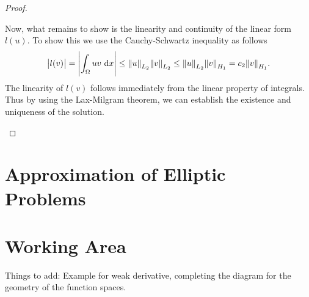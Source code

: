 \begin{proof}
\begin{enumerate}[(i)]
		Now, what remains to show is the linearity and continuity of the linear form $ l(u) $. To show this we use the Cauchy-Schwartz inequality as follows
		\[ \left| l(v) \right| = \left| \int_\Omega u v \, \operatorname{d}\!x \right| \leq \norm{u}_{L_2} \norm{v}_{L_2} \leq \norm{u}_{L_2}\norm{v}_{H_1} = c_2 \norm{v}_{H_1}. \]
		The linearity of $ l(v) $ follows immediately from the linear property of integrals. Thus by using the Lax-Milgram theorem, we can establish the existence and uniqueness of the solution.
	\end{enumerate}
\end{proof}


\section{Approximation of Elliptic Problems}

\section{Working Area}
Things to add: Example for weak derivative, completing the diagram for the geometry of the function spaces. 